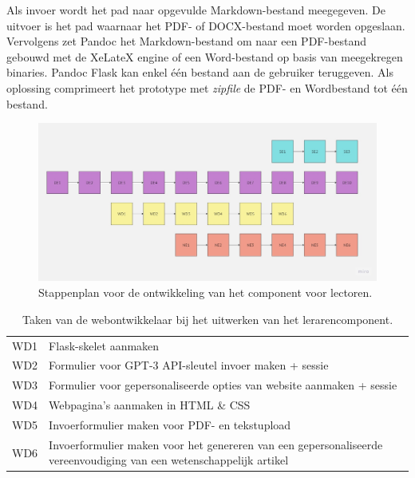 \medspace

Als invoer wordt het pad naar opgevulde Markdown-bestand meegegeven. De uitvoer is het pad waarnaar het PDF- of DOCX-bestand moet worden opgeslaan. Vervolgens zet Pandoc het Markdown-bestand om naar een PDF-bestand gebouwd met de XeLateX engine of een Word-bestand op basis van meegekregen binaries. Pandoc Flask kan enkel één bestand aan de gebruiker teruggeven. Als oplossing comprimeert het prototype met \textit{zipfile} de PDF- en Wordbestand tot één bestand. 

\begin{figure}[H]
	\includegraphics[width=\linewidth]{img/flowchart-development.jpg}
	\caption{Stappenplan voor de ontwikkeling van het component voor lectoren.}
	\label{img:stappenplan-leerkrachten}
\end{figure}

\begin{center}
	\begin{table}
		\begin{tabular}{ | m{2cm} | m{12cm} | } 
			\hline
			WD1 & Flask-skelet aanmaken \\
			WD2 & Formulier voor GPT-3 API-sleutel invoer maken + sessie \\
			WD3 & Formulier voor gepersonaliseerde opties van website aanmaken + sessie \\
			WD4 & Webpagina's aanmaken in HTML \& CSS \\
			WD5 & Invoerformulier maken voor PDF- en tekstupload \\
			WD6 & Invoerformulier maken voor het genereren van een gepersonaliseerde vereenvoudiging van een wetenschappelijk artikel \\
			\hline
		\end{tabular}
		\label{table:tasks-web-engineer}
		\caption{Taken van de webontwikkelaar bij het uitwerken van het lerarencomponent.}
	\end{table}
\end{center}

